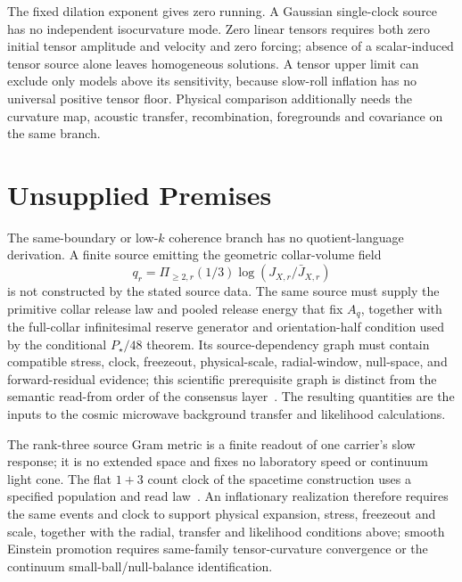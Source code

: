 \documentclass[11pt]{article}
\theoremstyle{remark}
\theoremstyle{plain}
\begin{document}
The fixed dilation exponent gives zero running. A Gaussian single-clock
source has no independent isocurvature mode. Zero linear tensors requires
both zero initial tensor amplitude and velocity and zero forcing; absence
of a scalar-induced tensor source alone leaves homogeneous solutions.
A tensor upper limit can exclude only models above its sensitivity, because
slow-roll inflation has no universal positive tensor floor. Physical
comparison additionally needs the curvature map, acoustic transfer,
recombination, foregrounds and covariance on the same branch.

\section{Unsupplied Premises}
\label{sec:unsupplied}

The same-boundary or low-\(k\) coherence branch has no quotient-language
derivation. A finite source emitting the geometric collar-volume field
\[
q_r=\Pi_{\ge2,r}(1/3)\log(J_{X,r}/\bar J_{X,r})
\]
is not constructed by the stated source data. The same source must supply the primitive collar release
law and pooled release energy that fix \(A_q\), together with the full-collar
infinitesimal reserve generator and orientation-half condition used by the
conditional \(P_\star/48\) theorem. Its source-dependency graph must contain
compatible stress, clock, freezeout, physical-scale, radial-window, null-space,
and forward-residual evidence; this scientific prerequisite graph is
distinct from the semantic read-from order of the consensus
layer~\cite{ophcmb}. The resulting quantities are the inputs to the cosmic
microwave background transfer and likelihood calculations.

The rank-three source Gram metric is a finite readout of one carrier's slow
response; it is no extended space and fixes no laboratory speed or
continuum light cone. The
flat \(1+3\) count clock of the spacetime construction uses a specified
population and read law~\cite{ophEinstein}. An inflationary realization
therefore requires the same events and clock to support physical expansion,
stress, freezeout and scale, together with the radial, transfer and
likelihood conditions above; smooth Einstein promotion requires same-family
tensor-curvature convergence or the continuum small-ball/null-balance
identification.
\end{document}
